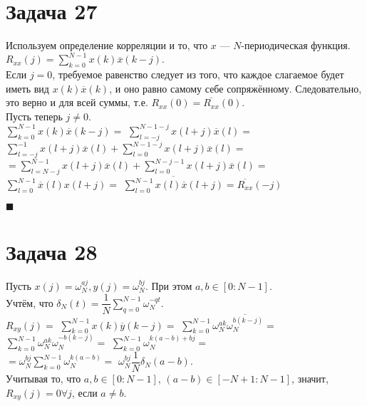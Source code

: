 \documentclass{article}
\title{}
\author{
	Дерюгин Денис, студент 561-й учебной группы
}
\date{\today}
\newcommand\proofend{\begin{flushright}$\blacksquare$\end{flushright}}
\begin{document}
\maketitle
\setcounter{MaxMatrixCols}{20}
\large {
\section*{Задача 27}
Используем определение корреляции и то, что $x$ --- $N$-периодическая функция.\\
$R_{xx}(j) = \sum\limits_{k=0}^{N-1} x(k) \overline{x}(k - j).$\\
Если $j = 0$, требуемое равенство следует из того, что каждое слагаемое будет иметь вид $x(k)\overline{x}(k)$, и оно равно самому себе сопряжённому. Следовательно, это верно и для всей суммы, т.е. $R_{xx}(0) = \overline{R_{xx}}(0)$.\\

Пусть теперь $j \neq 0$.\\
$\sum\limits_{k = 0}^{N - 1} x(k) \overline{x}(k - j) =$
$\sum\limits_{l = -j}^{N - 1 - j} x(l + j) \overline{x}(l) =$
$\sum\limits_{l = -j}^{- 1} x(l + j) \overline{x}(l) + \sum\limits_{l = 0}^{N - 1 - j} x(l + j) \overline{x}(l) = $ \\
$= \sum\limits_{l = N - j}^{N - 1} x(l + j) \overline{x}(l) + \sum\limits_{l = 0}^{N - j - 1} x(l + j) \overline{x}(l) = $
$\sum\limits_{l = 0}^{N - 1} \overline{x}(l) x(l + j) = $
$\overline{\sum\limits_{l = 0}^{N - 1} x(l) \overline{x}(l + j)} = \overline{R_{xx}}(-j)$
\proofend

\section*{Задача 28}
Пусть $x(j) = \omega_N^{aj}, y(j) = \omega_N^{bj}$. При этом $a, b \in [0 : N - 1]$.\\
Учтём, что $\delta_N(t) = \dfrac{1}{N}\sum\limits_{q=0}^{N-1}\omega_N^{-qt}$.\\
$R_{xy}(j) = $
$\sum\limits_{k = 0}^{N - 1} x(k) \overline{y} (k - j) =$
$\sum\limits_{k = 0}^{N - 1} \omega_N^{ak} \overline{\omega_N^{b(k-j)}} =$
$\sum\limits_{k = 0}^{N - 1} \omega_N^{ak} \omega_N^{-b(k - j)} =$
$\sum\limits_{k = 0}^{N - 1} \omega_N^{k(a - b) + bj} = $\\
$= \omega_N^{bj}\sum\limits_{k = 0}^{N - 1} \omega_N^{k(a - b)} = $
$\omega_N^{bj}\dfrac{1}{N}\delta_N(a - b).$\\

Учитывая то, что $a, b \in [0 : N -1]$, $(a - b) \in [-N + 1 : N - 1]$, значит, $R_{xy}(j) = 0 \forall j$, если $a \neq b$.

}
\end{document}
